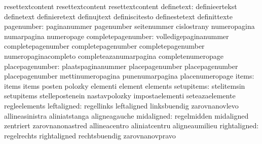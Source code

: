                                   resettextcontent                 resettextcontent
                                  resettextcontent
                      definetext: definieertekst                   definetext
                                  definieretext                    definujtext
                                  definiscitesto                   definestetext
                                  definittexte
                      pagenumber: paginanummer                     pagenumber
                                  seitenummer                      cislostrany
                                  numeropagina                     numarpagina
                                  numeropage
              completepagenumber: volledigepaginanummer            completepagenumber
                                  completepagenumber               completepagenumber %
                                  numeropaginacompleto             completeazanumarpagina %
                                  completenumeropage
                 placepagenumber: plaatspaginanummer               placepagenumber
                                  placepagenumber                  placepagenumber %
                                  mettinumeropagina                punenumarpagina %
                                  placenumeropage
                           items: items                            items
                                  posten                           polozky
                                  elementi                         element
                                  elements
                      setupitems: stelitemsin                      setupitems
                                  stellepostenein                  nastavpolozky
                                  impostaelementi                  seteazaelemente
                                  regleelements
                     leftaligned: regellinks                       leftaligned
                                  linksbuendig                     zarovnanovlevo
                                  allineasinistra                  aliniatstanga
                                  aligneagauche
                      midaligned: regelmidden                      midaligned
                                  zentriert                        zarovnanonastred
                                  allineacentro                    aliniatcentru
                                  aligneaumilieu
                    rightaligned: regelrechts                      rightaligned
                                  rechtsbuendig                    zarovnanovpravo
